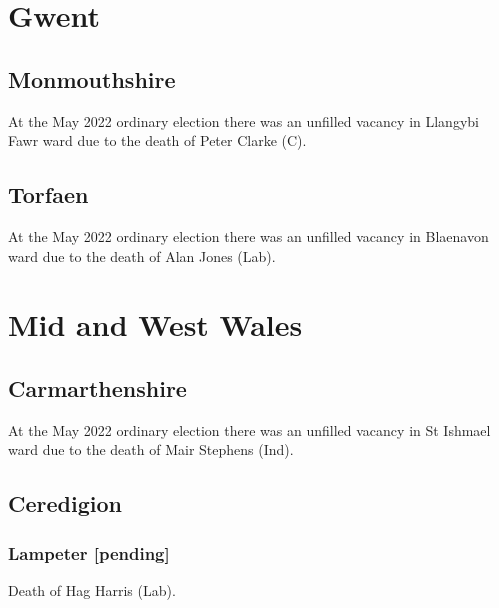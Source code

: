 \documentclass[a4paper,openany]{book}
\begin{document}
\begin{resultsiii}
\section{Gwent}

\subsection*{Monmouthshire}

At the May 2022 ordinary election there was an unfilled vacancy in Llangybi Fawr ward due to the death of Peter Clarke (C).%

\subsection*{Torfaen}

At the May 2022 ordinary election there was an unfilled vacancy in Blaenavon ward due to the death of Alan Jones (Lab).%

\section{Mid and West Wales}

\subsection*{Carmarthenshire}

At the May 2022 ordinary election there was an unfilled vacancy in St Ishmael ward due to the death of Mair Stephens (Ind).%

\subsection*{Ceredigion}

\subsubsection*{Lampeter \hspace*{\fill}\nolinebreak[1]%
	\enspace\hspace*{\fill}
	[pending]}


Death of Hag Harris (Lab).


\end{resultsiii}
\end{document}
